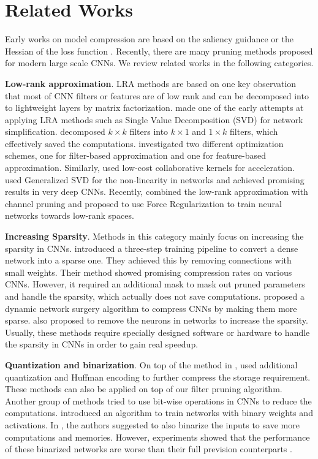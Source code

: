 \documentclass[10pt,twocolumn,letterpaper]{article}
\begin{document}
\section{Related Works}

Early works on model compression are based on the saliency guidance \cite{optimal} or the Hessian of the loss function \cite{second}. Recently, there are many pruning methods proposed for modern large scale CNNs. We review related works in the following categories.


\textbf{Low-rank approximation}. LRA methods \cite{exploit_linear,lr_expansion} are based on one key observation that most of CNN filters or features are of low rank and can be decomposed into to lightweight layers by matrix factorization. \cite{exploit_linear} made one of the early attempts at applying LRA methods such as Single Value Decomposition (SVD) for network simplification. \cite{lr_expansion} decomposed $k \times k$ filters into $k \times 1$ and $1 \times k$ filters, which effectively saved the computations. \cite{lr_expansion} investigated two different optimization schemes, one for filter-based approximation and one for feature-based approximation. Similarly, \cite{lccl} used low-cost collaborative kernels for acceleration. \cite{zhang_accelerating} used Generalized SVD for the non-linearity in networks and achieved promising results in very deep CNNs. Recently, \cite{yihuihe} combined the low-rank approximation with channel pruning and \cite{Wen_2017_ICCV} proposed to use Force Regularization to train neural networks towards low-rank spaces.


\textbf{Increasing Sparsity}. Methods in this category mainly focus on increasing the sparsity in CNNs. \cite{han_both,han_deep} introduced a three-step training pipeline to convert a dense network into a sparse one. They achieved this by removing connections with small weights. Their method showed promising compression rates on various CNNs. However, it required an additional mask to mask out pruned parameters and handle the sparsity, which actually does not save computations. \cite{dns} proposed a dynamic network surgery algorithm to compress CNNs by making them more sparse. \cite{alvarez2016learning,zhou2016less,BMVC2015_31} also proposed to remove the neurons in networks to increase the sparsity. Usually, these methods require specially designed software or hardware \cite{eie} to handle the sparsity in CNNs in order to gain real speedup.

\textbf{Quantization and binarization}. On top of the method in \cite{han_both}, \cite{han_deep} used additional quantization and Huffman encoding to further compress the storage requirement. These methods can also be applied on top of our filter pruning algorithm. Another group of methods tried to use bit-wise operations in CNNs to reduce the computations. \cite{bnn} introduced an algorithm to train networks with binary weights and activations. In \cite{xnor}, the authors suggested to also binarize the inputs to save more computations and memories. However, experiments showed that the performance of these binarized networks are worse than their full prevision counterparts \cite{xnor}.
\end{document}
